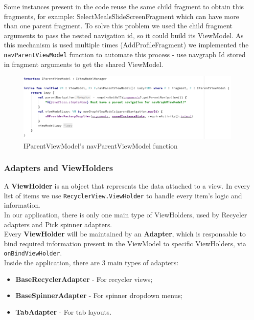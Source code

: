 Some instances present in the code reuse the same child fragment to obtain this fragments, for example: SelectMealsSlideScreenFragment
which can have more than one parent fragment. To solve this problem we used the child fragment arguments to pass the nested navigation id,
so it could build its ViewModel. As this mechanism is used multiple times (AddProfileFragment) we implemented the \texttt{navParentViewModel} function
to automate this process - use navgraph Id stored in fragment arguments to get the shared ViewModel.\\

\begin{figure}[H]
    \begin{center}
        \includegraphics[scale=0.5]{_figures/IParentViewModel.png}
        \caption{IParentViewModel's navParentViewModel function}
    \end{center}
\end{figure}

\subsubsection{Adapters and ViewHolders}

A \textbf{ViewHolder} is an object that represents the data attached to a view. In every list of items we use \texttt{RecyclerView.ViewHolder} 
to handle every item's logic and information.\\

In our application, there is only one main type of ViewHolders, used by Recycler adapters and Pick spinner adapters.\\

Every \textbf{ViewHolder} will be maintained by an \textbf{Adapter}, which is responsable to bind required information present in the ViewModel
to specific ViewHolders, via \texttt{onBindViewHolder}.\\

Inside the application, there are 3 main types of adapters:
\begin{itemize}
    \item \textbf{BaseRecyclerAdapter} - For recycler views;
    \item \textbf{BaseSpinnerAdapter} - For spinner dropdown menus;
    \item \textbf{TabAdapter} - For tab layouts.
\end{itemize}

